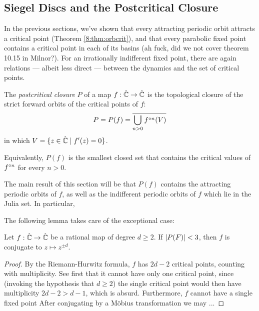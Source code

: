 \documentclass[../main.tex]{subfiles}
\newcommand\postcrit{P}
\newcommand\deriv[2]{{#1}'(#2)}
\begin{document}
\subsection{Siegel Discs and the Postcritical Closure}


In the previous sections, we've shown that every attracting periodic orbit attracts a critical point (Theorem \ref{8:thm:orbcrit}), and that every parabolic fixed point contains a critical point in each of its basins (ah fuck, did we not cover theorem 10.15 in Milnor?). For an irrationally indifferent fixed point, there are again relations --- albeit less direct --- between the dynamics and the set of critical points.

\begin{dfn} The \emph{postcritical closure} $\postcrit$ of a map $f : \hat{\mathbb{C}} \to \hat{\mathbb{C}}$ is the topological closure of the strict forward orbits of the critical points of $f$:
\[
\postcrit = \postcrit(f) = \cl{\bigcup\limits_{n > 0} \iter{f}{n}(V)}
\]
in which $V = \{ z \in \hat{\C} \mid \deriv{f}{z} = 0\}$.
\end{dfn}

Equivalently, $\postcrit(f)$ is the smallest closed set that contains the critical values of $f^{\circ n}$ for every $n > 0$. 

The main result of this section will be that $\postcrit(f)$ contains the attracting periodic orbits of $f$, as well as  the indifferent periodic orbits of $f$ which lie in the Julia set. In particular, 

The following lemma takes care of the exceptional case:

\begin{lem}
Let $f : \hat{\mathbb{C}} \to \hat{\mathbb{C}}$ be a rational map of degree $d \ge 2$. If $\abs{\postcrit(F)} < 3$, then $f$ is conjugate to $z \mapsto z^{\pm d}$.
\end{lem}
\begin{proof}
    By the Riemann-Hurwitz formula, $f$ has $2d-2$ critical points, counting with multiplicity. See first that it cannot have only one critical point, since (invoking the hypothesis that $d \ge 2$) the single critical point would then have multiplicity $2d-2 > d-1$, which is absurd.
    Furthermore, $f$ cannot have a single fixed point 
    After conjugating by a Möbius transformation we may ...
    
    
\end{proof}
\end{document}
